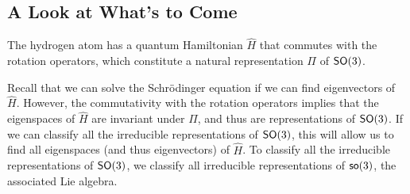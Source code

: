 \subsection{A Look at What's to Come}
The hydrogen atom has a quantum Hamiltonian $\hat{H}$ that commutes with the rotation operators, which constitute a natural representation $\Pi$ of $\operatorname{\textsf{SO}}(3)$.

Recall that we can solve the Schr\"{o}dinger equation if we can find eigenvectors of $\hat{H}$. However, the commutativity with the rotation operators implies that the eigenspaces of $\hat{H}$ are invariant under $\Pi$, and thus are representations of $\operatorname{\textsf{SO}}(3)$. If we can classify all the irreducible representations of $\operatorname{\textsf{SO}}(3)$, this will allow us to find all eigenspaces (and thus eigenvectors) of $\hat{H}$. To classify all the irreducible representations of $\operatorname{\textsf{SO}}(3)$, we classify all irreducible representations of $\operatorname{\textsf{so}}(3)$, the associated Lie algebra.
